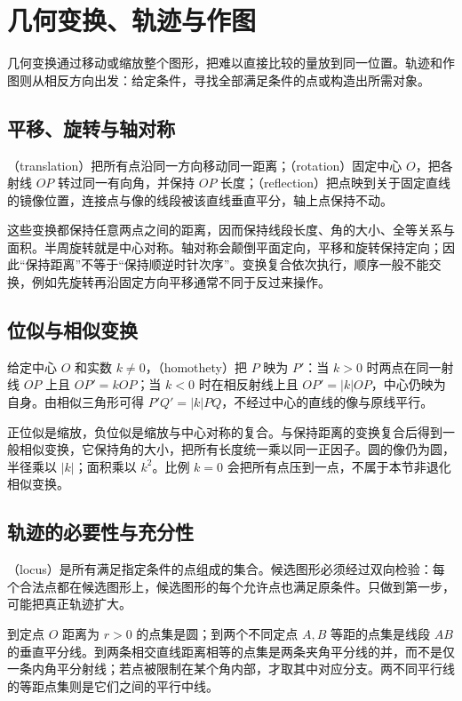 \documentclass[UTF8]{ctexbook}
\begin{document}
\chapter{几何变换、轨迹与作图}
\label{chap:em-transformations}
几何变换通过移动或缩放整个图形，把难以直接比较的量放到同一位置。轨迹和作图则从相反方向出发：给定条件，寻找全部满足条件的点或构造出所需对象。

\section{平移、旋转与轴对称}
（translation）把所有点沿同一方向移动同一距离；（rotation）固定中心 $O$，把各射线 $OP$ 转过同一有向角，并保持 $OP$ 长度；（reflection）把点映到关于固定直线的镜像位置，连接点与像的线段被该直线垂直平分，轴上点保持不动。

这些变换都保持任意两点之间的距离，因而保持线段长度、角的大小、全等关系与面积。半周旋转就是中心对称。轴对称会颠倒平面定向，平移和旋转保持定向；因此“保持距离”不等于“保持顺逆时针次序”。变换复合依次执行，顺序一般不能交换，例如先旋转再沿固定方向平移通常不同于反过来操作。

\section{位似与相似变换}
给定中心 $O$ 和实数 $k\ne0$，（homothety）把 $P$ 映为 $P'$：当 $k>0$ 时两点在同一射线 $OP$ 上且 $OP'=kOP$；当 $k<0$ 时在相反射线上且 $OP'=|k|OP$，中心仍映为自身。由相似三角形可得 $P'Q'=|k|PQ$，不经过中心的直线的像与原线平行。

正位似是缩放，负位似是缩放与中心对称的复合。与保持距离的变换复合后得到一般相似变换，它保持角的大小，把所有长度统一乘以同一正因子。圆的像仍为圆，半径乘以 $|k|$；面积乘以 $k^2$。比例 $k=0$ 会把所有点压到一点，不属于本节非退化相似变换。

\section{轨迹的必要性与充分性}
（locus）是所有满足指定条件的点组成的集合。候选图形必须经过双向检验：每个合法点都在候选图形上，候选图形的每个允许点也满足原条件。只做到第一步，可能把真正轨迹扩大。

到定点 $O$ 距离为 $r>0$ 的点集是圆；到两个不同定点 $A,B$ 等距的点集是线段 $AB$ 的垂直平分线。到两条相交直线距离相等的点集是两条夹角平分线的并，而不是仅一条内角平分射线；若点被限制在某个角内部，才取其中对应分支。两不同平行线的等距点集则是它们之间的平行中线。
\end{document}
